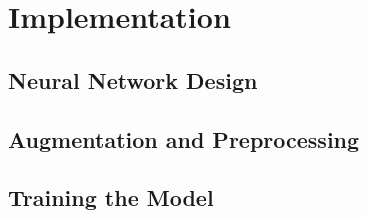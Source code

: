 \section{Implementation}

\subsection{Neural Network Design}
\subsection{Augmentation and Preprocessing}
\subsection{Training the Model}
